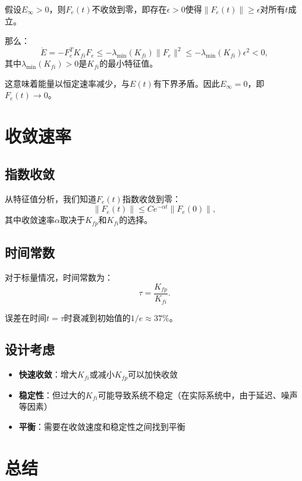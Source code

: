 \documentclass{article}
\begin{document}
假设$E_{\infty} > 0$，则$F_e(t)$不收敛到零，即存在$\epsilon > 0$使得$\|F_e(t)\| \geq \epsilon$对所有$t$成立。

那么：
\begin{equation}
\dot{E} = -F_e^T K_{fi}F_e \leq -\lambda_{\min}(K_{fi})\|F_e\|^2 \leq -\lambda_{\min}(K_{fi})\epsilon^2 < 0,
\end{equation}
其中$\lambda_{\min}(K_{fi}) > 0$是$K_{fi}$的最小特征值。

这意味着能量以恒定速率减少，与$E(t)$有下界矛盾。因此$E_{\infty} = 0$，即$F_e(t) \to 0$。

\section{收敛速率}

\subsection{指数收敛}

从特征值分析，我们知道$F_e(t)$指数收敛到零：
\begin{equation}
\|F_e(t)\| \leq Ce^{-\alpha t}\|F_e(0)\|,
\end{equation}
其中收敛速率$\alpha$取决于$K_{fp}$和$K_{fi}$的选择。

\subsection{时间常数}

对于标量情况，时间常数为：
\begin{equation}
\tau = \frac{K_{fp}}{K_{fi}}.
\end{equation}

误差在时间$t = \tau$时衰减到初始值的$1/e \approx 37\%$。

\subsection{设计考虑}

\begin{itemize}
\item \textbf{快速收敛}：增大$K_{fi}$或减小$K_{fp}$可以加快收敛
\item \textbf{稳定性}：但过大的$K_{fi}$可能导致系统不稳定（在实际系统中，由于延迟、噪声等因素）
\item \textbf{平衡}：需要在收敛速度和稳定性之间找到平衡
\end{itemize}

\section{总结}
\end{document}
